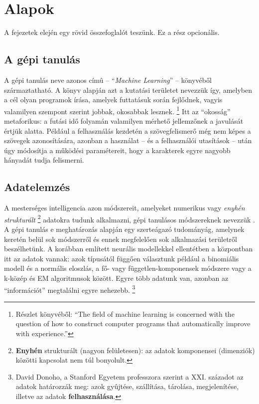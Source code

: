 \chapter{Alapok}\label{ch:ALAP}

\begin{osszefoglal}
	A fejezetek elején egy rövid összefoglalót teszünk. Ez a rész opcionális.
	
\end{osszefoglal}

\section{A gépi tanulás}\label{sec:ALAP:ml}

A gépi tanulás neve   azonos címû -- ``{\em Machine Learning}'' -- könyvéből származtatható.
A könyv alapján azt a kutatási területet nevezzük így, amelyben a cél olyan programok írása, amelyek  futtatásuk során fejlődnek, vagyis valamilyen szempont szerint jobbak, okosabbak lesznek.%
\footnote{ %
Részlet  könyvéből:\newline
    ``The field of machine learning is concerned with the question of how to construct computer programs    that automatically improve with experience.''
}  %
Itt az ``okosság'' metaforikus: a futási idő folyamán valamilyen mérhető jellemzőnek a javulását értjük alatta.
%
Például a felhasználás kezdetén a szövegfelismerő még nem képes a szövegek azonosítására, azonban a használat -- és a felhasználói utasítások -- után úgy módosítja a működési paramétereit, hogy a karakterek egyre nagyobb hányadát tudja felismerni.


\section{Adatelemzés}\label{sec:ALAP:adatelem}

A mesterséges intelligencia azon módszereit, amelyeket numerikus
vagy {\em
  enyhén strukturált}%
\footnote{%
 {\bf Enyhén} strukturált (nagyon felületesen): az adatok komponensei
  (dimenziók) közötti kapcsolat nem túl bonyolult.
}%
adatokra tudunk alkalmazni, gépi tanulásos módszereknek nevezzük
\cite{Mitchell97}.  A gépi tanulás e meghatározás alapján egy
szerteágazó tudományág, amelynek keretén belül sok módszerről és
ennek megfelelően sok alkalmazási területről beszélhetünk. A
korábban említett neurális modellekkel ellentétben a központban
itt az adatok vannak: azok típusától függően választunk például a
binomiális modell és a normális eloszlás, a fő- vagy
független-komponensek módszere vagy a k-közép és EM
algoritmusok között.
Egyre több adatunk van, azonban az ``információt'' megtalálni egyre nehezebb.%
\footnote{%
    David Donoho, a Stanford Egyetem professzora szerint a XXI. századot az adatok határozzák meg: azok gyûjtése, szállítása, tárolása, megjelenítése, illetve az adatok {\bf felhasználása}.
}%


